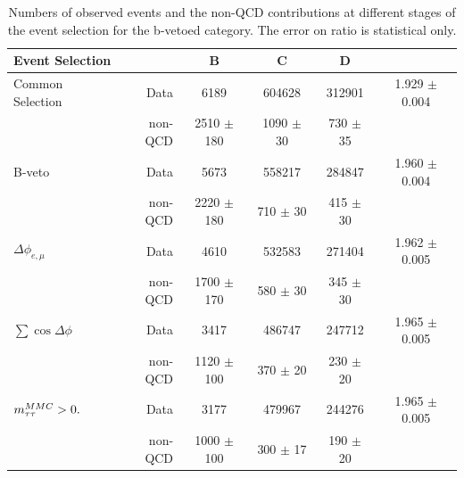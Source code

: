 \begin{table} [!p]
	\caption{Numbers of observed events and the  non-QCD contributions at different stages of the event selection for the b-vetoed category. 
	The error on  \rqcd ratio is statistical only.}
\begin{small}
	\begin{tabular}[c]{l r c c c c}
\hline
\hline 
Event Selection  &  		& B & C & D &  \rqcd \\ 
\hline
Common Selection 	&   Data	&6189			&604628			&312901		    &	1.929 $\pm$  	0.004		\\
	        &   non-QCD	&2510 $\pm$  180  	&1090 $\pm$   30  	&730	$\pm$ 35    &				\\
\hline
B-veto	     	&   Data	&5673		  & 558217 		& 284847		    &	1.960	$\pm$	0.004	\\
	     	&   non-QCD	&2220	$\pm$ 180 & 710 $\pm$ 30	& 415 $\pm$	30	    &				\\
\hline
$\Delta\phi_{e,\mu}$  &   Data		&4610		&532583 		&271404		    	    &	1.962	$\pm$	0.005	\\
	     &   non-QCD	&1700 $\pm$170	&580 $\pm$	30	& 345 $\pm$	30	    &				\\
\hline
$\sum\cos\Delta\phi$ &   Data& 3417	&486747 		& 247712	   		    &	1.965	$\pm$	0.005 	\\
	     &   non-QCD     & 1120  $\pm$ 100	& 370 $\pm$ 	20		& 230 $\pm$	20  &				\\
\hline
$m_{\tau\tau}^{MMC} > 0.$    &  Data		& 3177		& 479967 		& 244276	    	    &	1.965	$\pm$	0.005	\\
	     &   non-QCD	& 1000 $\pm$ 100	& 300  $\pm$ 17		&190	$\pm$ 20    &			\\[1ex]
\hline
\hline
	\end{tabular}
\end{small}
	\centering
	\label{table:qcd_yield_bveto}
\end{table}

